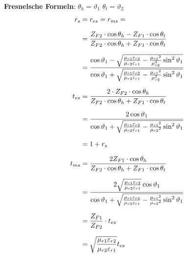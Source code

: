 \textbf{Fresnelsche Formeln}: \qquad $ \theta_h = \vartheta_{1} $ \quad $ \theta_t = \vartheta_{2} $
\begin{equation*}
	\setlength{\jot}{10pt}
	\begin{aligned}
		r_s    & =  r_{es} = r_{ms} =                                                                                                                                            \\
		& = \frac{Z_{F2} \cdot \cos \theta_h-Z_{F1} \cdot \cos \theta_t}{Z_{F2} \cdot \cos \theta_h+Z_{F1} \cdot \cos \theta_t}                                           \\
& =\frac{\cos \vartheta_1-\sqrt{\frac{\mu_{r 1} \varepsilon_{r 2}}{\mu_{r 2} \varepsilon_{r 1}}-\frac{\mu_{r 1}{ }^2}{\mu_{r 2}^2} \sin ^2 \vartheta_1}}{\cos \vartheta_1+\sqrt{\frac{\mu_{r 1} \varepsilon_{r 2}}{\mu_{r 2} \varepsilon_{r 1}}-\frac{\mu_{r 1}{ }^2}{\mu_{r 2}^2} \sin ^2 \vartheta_1}} \\
		t_{es} & =\frac{2 \cdot	 Z_{F2} \cdot \cos \theta_h}{Z_{F2} \cdot \cos \theta_h+Z_{F1} \cdot \cos \theta_t}                                                              \\
& =\frac{2 \cos \vartheta_1}{\cos \vartheta_1+\sqrt{\frac{\mu_{r 1} \varepsilon_{r 2}}{\mu_{r 2} \varepsilon_{r 1}}-\frac{\mu_{r 1}{ }^2}{\mu_{r 2}{ }^2} \sin ^2 \vartheta_1}} \\
		& = 1+r_s\\
		t_{ms} & = \frac{2 Z_{F1} \cdot \cos \theta_h}{Z_{F2} \cdot \cos \theta_h+Z_{F1} \cdot \cos \theta_t}                                                              \\
		& =\frac{2 \sqrt{\frac{\mu_{r 1} \varepsilon_{r 2}}{\mu_{r 2} \varepsilon_{r 1}}} \cos \vartheta_1}{\cos \vartheta_1+\sqrt{\frac{\mu_{r 1} \varepsilon_{r 2}}{\mu_{r 2} \varepsilon_{r 1}}-\frac{\mu_{r 1}{ }^2}{\mu_{r 2}{ }^2} \sin ^2 \vartheta_1}}
		\\
		& = \frac{Z_{F1}}{Z_{F2}}\cdot t_{es}\\
		& =\sqrt{\frac{\mu_{r 1} \varepsilon_{r 2}}{\mu_{r 2} \varepsilon_{r 1}}} t_{e s}                                                                                                                   
	\end{aligned}
\end{equation*}



